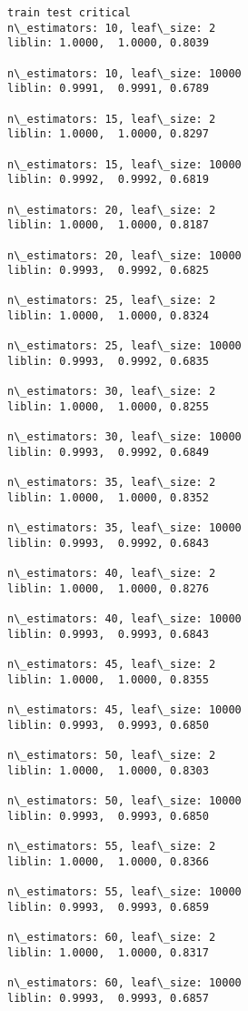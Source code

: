 \documentclass[11pt]{article}
\begin{document}
    \begin{Verbatim}[commandchars=\\\{\}]
train test critical
n\_estimators: 10, leaf\_size: 2
liblin: 1.0000,  1.0000, 0.8039 

n\_estimators: 10, leaf\_size: 10000
liblin: 0.9991,  0.9991, 0.6789 

n\_estimators: 15, leaf\_size: 2
liblin: 1.0000,  1.0000, 0.8297 

n\_estimators: 15, leaf\_size: 10000
liblin: 0.9992,  0.9992, 0.6819 

n\_estimators: 20, leaf\_size: 2
liblin: 1.0000,  1.0000, 0.8187 

n\_estimators: 20, leaf\_size: 10000
liblin: 0.9993,  0.9992, 0.6825 

n\_estimators: 25, leaf\_size: 2
liblin: 1.0000,  1.0000, 0.8324 

n\_estimators: 25, leaf\_size: 10000
liblin: 0.9993,  0.9992, 0.6835 

n\_estimators: 30, leaf\_size: 2
liblin: 1.0000,  1.0000, 0.8255 

n\_estimators: 30, leaf\_size: 10000
liblin: 0.9993,  0.9992, 0.6849 

n\_estimators: 35, leaf\_size: 2
liblin: 1.0000,  1.0000, 0.8352 

n\_estimators: 35, leaf\_size: 10000
liblin: 0.9993,  0.9992, 0.6843 

n\_estimators: 40, leaf\_size: 2
liblin: 1.0000,  1.0000, 0.8276 

n\_estimators: 40, leaf\_size: 10000
liblin: 0.9993,  0.9993, 0.6843 

n\_estimators: 45, leaf\_size: 2
liblin: 1.0000,  1.0000, 0.8355 

n\_estimators: 45, leaf\_size: 10000
liblin: 0.9993,  0.9993, 0.6850 

n\_estimators: 50, leaf\_size: 2
liblin: 1.0000,  1.0000, 0.8303 

n\_estimators: 50, leaf\_size: 10000
liblin: 0.9993,  0.9993, 0.6850 

n\_estimators: 55, leaf\_size: 2
liblin: 1.0000,  1.0000, 0.8366 

n\_estimators: 55, leaf\_size: 10000
liblin: 0.9993,  0.9993, 0.6859 

n\_estimators: 60, leaf\_size: 2
liblin: 1.0000,  1.0000, 0.8317 

n\_estimators: 60, leaf\_size: 10000
liblin: 0.9993,  0.9993, 0.6857 


    \end{Verbatim}
\end{document}
